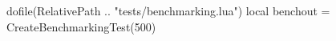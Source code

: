 \documentclass[oneside]{memoir}
\begin{document}
\pagestyle{empty}

\activateBenchmarking

\begin{luacode*}
	dofile(RelativePath .. "tests/benchmarking.lua")
	local benchout = CreateBenchmarkingTest(500)
\end{luacode*}

\printRpgTexErrors

\printRpgTexBenchmarking
\end{document}
